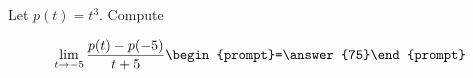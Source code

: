 \documentclass{ximera}
\author{Bart Snapp}
\begin{document}
\begin{exercise}
Let $p(t) = t^3$. Compute

\[
\lim_{ t\to -5 } 
\frac{p(t)-p(-5)}{t+5} \begin{prompt}=\answer{75}\end{prompt}
\]
\end{exercise}
\end{document}
